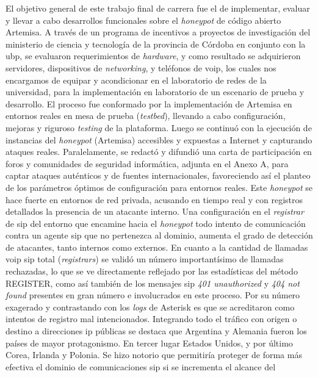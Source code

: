 \documentclass[a4paper,12pt]{report}
\begin{document}
El objetivo general de este trabajo final de carrera fue el de implementar, evaluar y llevar a cabo
desarrollos funcionales sobre el \emph{honeypot} de código abierto Artemisa. A través de un programa
de incentivos a proyectos de investigación del ministerio de ciencia y tecnología de
la provincia de Córdoba en conjunto con 
la \ac{ubp}, se \mbox{evaluaron} requerimientos de \emph{hardware}, y como resultado se
adquirieron servidores, dispositivos de \emph{networking},
y teléfonos de \ac{voip}, los cuales nos encargamos de equipar y acondicionar en el laboratorio
de redes de la universidad, para la implementación en laboratorio de un escenario de prueba
y de\-sa\-rro\-llo. El proceso fue conformado por la implementación de Artemisa en entornos reales en mesa
de prueba (\emph{testbed}), llevando a cabo configuración, mejoras y riguroso \emph{testing} de la plataforma.
Luego se continuó con la ejecución de instancias del \emph{honeypot} (Artemisa) accesibles y expuestas a Internet y
capturando ataques reales. Paralelamente, se redactó y difundió una carta de \mbox{participación} en foros y 
comunidades de seguridad informática, adjunta en el Anexo A, para captar ataques auténticos y de fuentes
internacionales, favoreciendo así el planteo de los parámetros óptimos de configuración 
para entornos reales.
Este \emph{honeypot} se hace fuerte en entornos de red privada, acusando en
tiempo real y con registros detallados la presencia de un atacante interno.
Una configuración en el \emph{registrar} de \ac{sip} del entorno que encamine hacia
el \emph{honeypot} todo intento de comunicación contra un agente \ac{sip} que no 
pertenezca al dominio, aumenta el grado de detección de atacantes, tanto internos como
externos.
En cuanto a la cantidad de llamadas \ac{voip} \ac{sip} total (\emph{registrars})
se validó un número importantísimo de llamadas rechazadas, lo que se ve directamente
reflejado por las estadísticas del método REGISTER, como así también de los mensajes \ac{sip}
\emph{401 unauthorized} y \emph{404 not found} presentes en gran número e involucrados en este proceso. 
Por su número exagerado y \mbox{contrastando} con los \emph{logs} de Asterisk es que 
se acreditaron como intentos de
registro mal intencionados. Integrando todo el tráfico con origen o destino 
a direcciones \ac{ip} públicas se destaca que Argentina y Alemania fueron los países de mayor protagonismo.
En tercer lugar Estados Unidos, y por último Corea, Irlanda y Polonia.
Se hizo notorio que permitiría proteger de forma más efectiva
el dominio de comunicaciones \ac{sip} si se incrementa el alcance del
\end{document}
